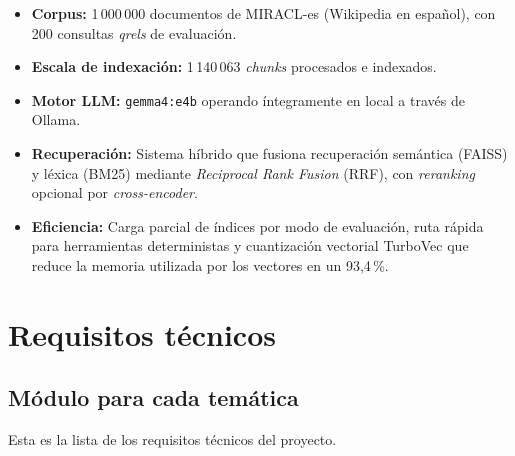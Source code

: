 \documentclass[11pt,a4paper]{article}
\newcommand{\code}[1]{\texttt{#1}}
\begin{document}
\begin{itemize}
  \item \textbf{Corpus:} 1\,000\,000 documentos de MIRACL-es (Wikipedia en español), con 200 consultas \textit{qrels} de evaluación.
  \item \textbf{Escala de indexación:} 1\,140\,063 \textit{chunks} procesados e indexados.
  \item \textbf{Motor LLM:} \code{gemma4:e4b} operando íntegramente en local a través de Ollama.
  \item \textbf{Recuperación:} Sistema híbrido que fusiona recuperación semántica (FAISS) y léxica (BM25) mediante \textit{Reciprocal Rank Fusion} (RRF), con \textit{reranking} opcional por \textit{cross-encoder}.
  \item \textbf{Eficiencia:} Carga parcial de índices por modo de evaluación, ruta rápida para herramientas deterministas y cuantización vectorial TurboVec que reduce la memoria utilizada por los vectores en un 93,4\,\%.
\end{itemize}

\section{Requisitos técnicos}

\subsection{Módulo para cada temática}

Esta es la lista de los requisitos técnicos del proyecto.
\end{document}
